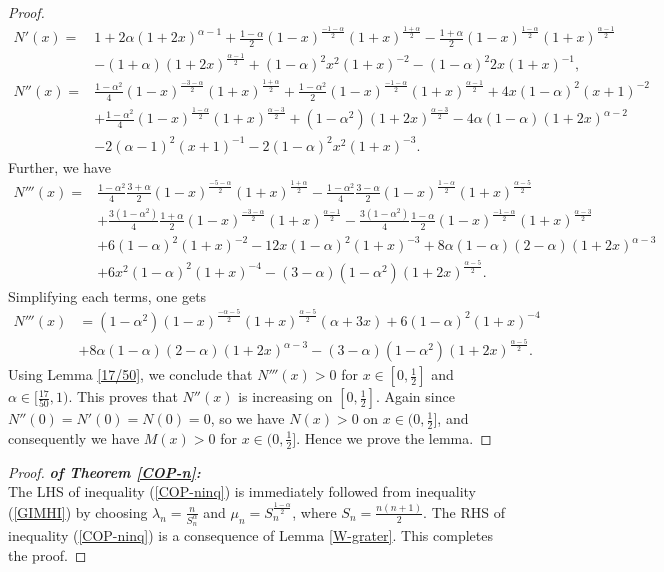 \documentclass[12pt]{amsart}
\theoremstyle{definition}
\theoremstyle{plain}
\theoremstyle{definition}
\numberwithin{equation}{section}
\begin{document}
\begin{proof}
\begin{align*}
N'(x)=&1+2\alpha(1+2x)^{\alpha-1}+\frac{1-\alpha}{2}(1-x)^{\frac{-1-\alpha}{2}}(1+x)^{\frac{1+\alpha}{2}}-\frac{1+\alpha}{2}(1-x)^{\frac{1-\alpha}{2}}(1+x)^{\frac{\alpha-1}{2}}\\
&-(1+\alpha)(1+2x)^{\frac{\alpha-1}{2}}+(1-\alpha)^{2}x^{2}(1+x)^{-2}-(1-\alpha)^{2}2x(1+x)^{-1},\\
N''(x)=&\frac{1-\alpha^{2}}{4}(1-x)^{\frac{-3-\alpha}{2}}(1+x)^{\frac{1+\alpha}{2}}+\frac{1-\alpha^{2}}{2}(1-x)^{\frac{-1-\alpha}{2}}(1+x)^{\frac{\alpha-1}{2}}+
4x(1-\alpha)^{2}(x+1)^{-2}\\
&+\frac{1-\alpha^{2}}{4}(1-x)^{\frac{1-\alpha}{2}}(1+x)^{\frac{\alpha-3}{2}}+(1-\alpha^{2})(1+2x)^{\frac{\alpha-3}{2}}-4\alpha(1-\alpha)(1+2x)^{\alpha-2}\\
&-2(\alpha-1)^{2}(x+1)^{-1}-2(1-\alpha)^{2}x^{2}(1+x)^{-3}.
\end{align*}
Further, we have
\begin{align*}
N'''(x)=&\frac{1-\alpha^{2}}{4}\frac{3+\alpha}{2}(1-x)^{\frac{-5-\alpha}{2}}(1+x)^{\frac{1+\alpha}{2}}-\frac{1-\alpha^{2}}{4}
\frac{3-\alpha}{2}(1-x)^{\frac{1-\alpha}{2}}(1+x)^{\frac{\alpha-5}{2}}\\
&+\frac{3(1-\alpha^{2})}{4}\frac{1+\alpha}{2}(1-x)^{\frac{-3-\alpha}{2}}(1+x)^{\frac{\alpha-1}{2}}-\frac{3(1-\alpha^{2})}{4}
\frac{1-\alpha}{2}(1-x)^{\frac{-1-\alpha}{2}}(1+x)^{\frac{\alpha-3}{2}}\\
&+6(1-\alpha)^{2}(1+x)^{-2}-12x(1-\alpha)^{2}(1+x)^{-3}+8\alpha(1-\alpha)(2-\alpha)(1+2x)^{\alpha-3}\\
&+6x^{2}(1-\alpha)^{2}(1+x)^{-4}-(3-\alpha)(1-\alpha^{2})(1+2x)^{\frac{\alpha-5}{2}}.
\end{align*}
Simplifying each terms, one gets
\begin{align*}
N'''(x)&=(1-\alpha^{2})(1-x)^{\frac{-\alpha-5}{2}}(1+x)^{\frac{\alpha-5}{2}}(\alpha+3x)+6(1-\alpha)^{2}(1+x)^{-4}\\
&+8\alpha(1-\alpha)(2-\alpha)(1+2x)^{\alpha-3}-(3-\alpha)(1-\alpha^{2})(1+2x)^{\frac{\alpha-5}{2}}.
\end{align*}
Using Lemma \ref{17/50}, we conclude that $N'''(x)>0$ for $x\in[0, \frac{1}{2}]$ and $\alpha\in[\frac{17}{50}, 1)$. This proves that $N''(x)$ is increasing on $[0, \frac{1}{2}]$. Again since $N''(0)=N'(0)=N(0)=0$, so we have $N(x)>0$ on $x\in(0, \frac{1}{2}]$, and consequently we have $M(x)>0$ for $x\in(0, \frac{1}{2}]$. Hence we prove the lemma.
\end{proof}

\begin{proof}
\emph{\textbf{of Theorem \ref{COP-n}:}}\\
The LHS of inequality (\ref{COP-ninq}) is immediately followed from inequality (\ref{GIMHI}) by choosing $\lambda_{n}=\frac{n}{S_{n}^{\alpha}}$ and $\mu_{n}=S_{n}^{\frac{1-\alpha}{2}}$, where $S_{n}=\frac{n(n+1)}{2}$. The RHS of inequality (\ref{COP-ninq}) is a consequence of Lemma \ref{W-grater}. This completes the proof.
\end{proof}
\end{document}
